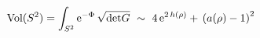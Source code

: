 \begin{equation} 
\label{vol} \mbox{Vol}(S^2) = \int_{S^2}{\rm  e}^{- \Phi}\,\sqrt{\mbox{det}G} 
~\sim~ 4 \,{\rm e}^{2\,h(\rho)} + \,\left(a(\rho)-1\right)^2~
\end{equation}

